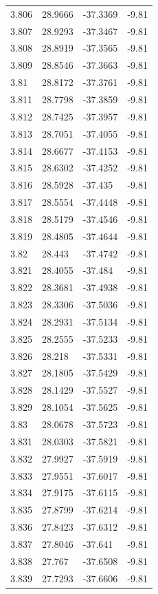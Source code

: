 \begin{tabular}{llll}
3.806 & 28.9666 & -37.3369 & -9.81 \\
3.807 & 28.9293 & -37.3467 & -9.81 \\
3.808 & 28.8919 & -37.3565 & -9.81 \\
3.809 & 28.8546 & -37.3663 & -9.81 \\
3.81 & 28.8172 & -37.3761 & -9.81 \\
3.811 & 28.7798 & -37.3859 & -9.81 \\
3.812 & 28.7425 & -37.3957 & -9.81 \\
3.813 & 28.7051 & -37.4055 & -9.81 \\
3.814 & 28.6677 & -37.4153 & -9.81 \\
3.815 & 28.6302 & -37.4252 & -9.81 \\
3.816 & 28.5928 & -37.435 & -9.81 \\
3.817 & 28.5554 & -37.4448 & -9.81 \\
3.818 & 28.5179 & -37.4546 & -9.81 \\
3.819 & 28.4805 & -37.4644 & -9.81 \\
3.82 & 28.443 & -37.4742 & -9.81 \\
3.821 & 28.4055 & -37.484 & -9.81 \\
3.822 & 28.3681 & -37.4938 & -9.81 \\
3.823 & 28.3306 & -37.5036 & -9.81 \\
3.824 & 28.2931 & -37.5134 & -9.81 \\
3.825 & 28.2555 & -37.5233 & -9.81 \\
3.826 & 28.218 & -37.5331 & -9.81 \\
3.827 & 28.1805 & -37.5429 & -9.81 \\
3.828 & 28.1429 & -37.5527 & -9.81 \\
3.829 & 28.1054 & -37.5625 & -9.81 \\
3.83 & 28.0678 & -37.5723 & -9.81 \\
3.831 & 28.0303 & -37.5821 & -9.81 \\
3.832 & 27.9927 & -37.5919 & -9.81 \\
3.833 & 27.9551 & -37.6017 & -9.81 \\
3.834 & 27.9175 & -37.6115 & -9.81 \\
3.835 & 27.8799 & -37.6214 & -9.81 \\
3.836 & 27.8423 & -37.6312 & -9.81 \\
3.837 & 27.8046 & -37.641 & -9.81 \\
3.838 & 27.767 & -37.6508 & -9.81 \\
3.839 & 27.7293 & -37.6606 & -9.81 \\

\end{tabular}
